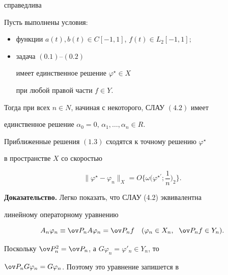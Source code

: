 справедлива





\begin{thm}


Пусть выполнены условия\/$:$


\begin{itemize}


\item[a)] функции $a(t), b(t)\in C[-1, 1]$, $f(t)\in L_2[-1, 1];$


\item[б)] задача $(0.1)$--$(0.2)$


имеет единственное решение $\varphi^{\star}\in X$


при любой правой части $f\in Y$. 


\end{itemize}





Тогда при всех $n\in N$, начиная с некоторого, СЛАУ $(4.2)$ имеет 


единственное решение $\alpha_0=0$, $\alpha_1, \dotsc,\alpha_n\in R$. 


Приближенные решения $(1.3)$ сходятся к точному решению $\varphi^{\star}$ 


в пространстве $X$ со скоростью


\begin{equation}


\|\varphi^{\star}-\varphi_n\|_X=O\bigg\{\omega\bigg(\varphi^{\star'};


\frac{1}{n}\bigg)_2\bigg\}. 


\end{equation}


\end{thm}





{\bf Доказательство.} Легко показать, что СЛАУ (4.2) эквивалентна 


линейному операторному уравнению


$$


A_n\varphi_n\equiv\ov P_nA\varphi_n=\ov P_nf\quad (\varphi_n\in X_n, 


\ \; \ov P_nf\in Y_n). 


$$


Поскольку $\ov P_n^2=\ov P_n$, а $G\varphi_n=\varphi'_n\in Y_n$, то


$\ov P_nG\varphi_n=G\varphi_n$. Поэтому это уравнение запишется в


